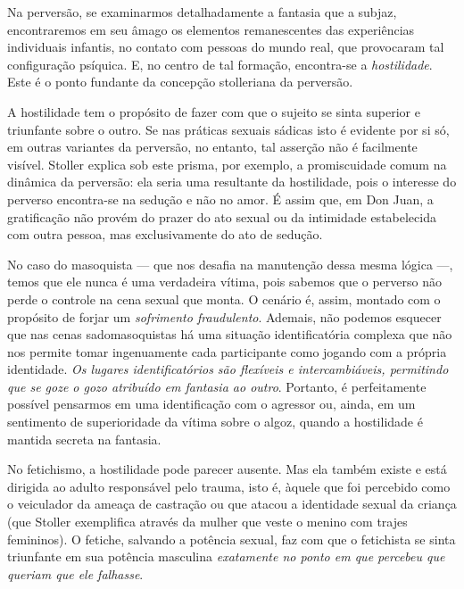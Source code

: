 Na perversão, se examinarmos detalhadamente a fantasia que a subjaz,
encontraremos em seu âmago os elementos remanescentes das experiências
individuais infantis, no contato com pessoas do mundo real, que
provocaram tal configuração psíquica. E, no centro de tal formação,
encontra-se a \emph{hostilidade}. Este é o ponto fundante da concepção
stolleriana da perversão.

A hostilidade tem o propósito de fazer com que o sujeito se sinta
superior e triunfante sobre o outro. Se nas práticas sexuais sádicas
isto é evidente por si só, em outras variantes da perversão, no entanto,
tal asserção não é facilmente visível. Stoller explica sob este prisma,
por exemplo, a promiscuidade comum na dinâmica da perversão: ela seria
uma resultante da hostilidade, pois o interesse do perverso encontra-se
na sedução e não no amor. É assim que, em Don Juan, a gratificação não
provém do prazer do ato sexual ou da intimidade estabelecida com outra
pessoa, mas exclusivamente do ato de sedução.

No caso do masoquista --- que nos desafia na manutenção dessa mesma
lógica ---, temos que ele nunca é uma verdadeira vítima, pois sabemos
que o perverso não perde o controle na cena sexual que monta. O cenário
é, assim, montado com o propósito de forjar um \emph{sofrimento
fraudulento}. Ademais, não podemos esquecer que nas cenas
sadomasoquistas há uma situação identificatória complexa que não nos
permite tomar ingenuamente cada participante como jogando com a própria
identidade. \emph{Os lugares identificatórios são flexíveis e
intercambiáveis, permitindo que se goze o gozo atribuído em fantasia ao
outro}. Portanto, é perfeitamente possível pensarmos em uma
identificação com o agressor ou, ainda, em um sentimento de
superioridade da vítima sobre o algoz, quando a hostilidade é mantida
secreta na fantasia.

No fetichismo, a hostilidade pode parecer ausente. Mas ela também existe
e está dirigida ao adulto responsável pelo trauma, isto é, àquele que
foi percebido como o veiculador da ameaça de castração ou que atacou a
identidade sexual da criança (que Stoller exemplifica através da mulher
que veste o menino com trajes femininos). O fetiche, salvando a potência
sexual, faz com que o fetichista se sinta triunfante em sua potência
masculina \emph{exatamente no ponto em que percebeu que queriam que ele
falhasse}.

